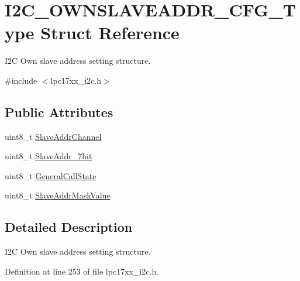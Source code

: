 \hypertarget{struct_i2_c___o_w_n_s_l_a_v_e_a_d_d_r___c_f_g___type}{\section{\-I2\-C\-\_\-\-O\-W\-N\-S\-L\-A\-V\-E\-A\-D\-D\-R\-\_\-\-C\-F\-G\-\_\-\-Type \-Struct \-Reference}
\label{struct_i2_c___o_w_n_s_l_a_v_e_a_d_d_r___c_f_g___type}
}


\-I2\-C \-Own slave address setting structure.  




{\ttfamily \#include $<$lpc17xx\-\_\-i2c.\-h$>$}

\subsection*{\-Public \-Attributes}
\begin{DoxyCompactItemize}
\item 
uint8\-\_\-t \hyperlink{struct_i2_c___o_w_n_s_l_a_v_e_a_d_d_r___c_f_g___type_a837b455a7cd6e12fc75175e4a3eebe7d}{\-Slave\-Addr\-Channel}
\item 
uint8\-\_\-t \hyperlink{struct_i2_c___o_w_n_s_l_a_v_e_a_d_d_r___c_f_g___type_a68d407a41be44644ce3ee911f59bc870}{\-Slave\-Addr\-\_\-7bit}
\item 
uint8\-\_\-t \hyperlink{struct_i2_c___o_w_n_s_l_a_v_e_a_d_d_r___c_f_g___type_a7854696cf45e880ce3602d3c020fcdb5}{\-General\-Call\-State}
\item 
uint8\-\_\-t \hyperlink{struct_i2_c___o_w_n_s_l_a_v_e_a_d_d_r___c_f_g___type_ad7ade56e1eca1d7c2206ea2c81d2e9f6}{\-Slave\-Addr\-Mask\-Value}
\end{DoxyCompactItemize}


\subsection{\-Detailed \-Description}
\-I2\-C \-Own slave address setting structure. 

\-Definition at line 253 of file lpc17xx\-\_\-i2c.\-h.



